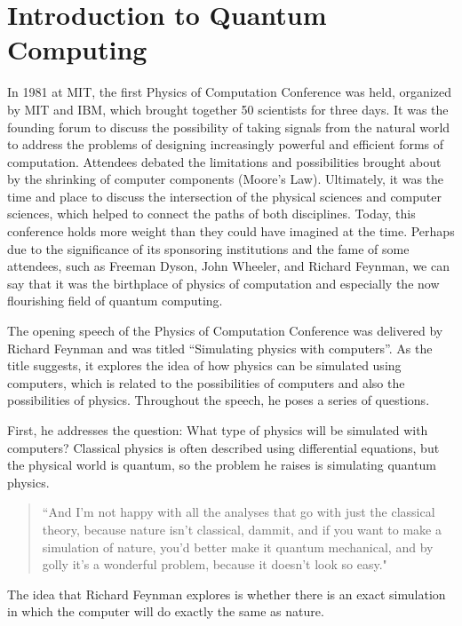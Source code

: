 
\chapter{Introduction to Quantum Computing} \label{ch:2-IntroQC}



In 1981 at MIT, the first Physics of Computation Conference was held, organized by MIT and IBM, which brought together 50 scientists for three days. It was the founding forum to discuss the possibility of taking signals from the natural world to address the problems of designing increasingly powerful and efficient forms of computation. Attendees debated the limitations and possibilities brought about by the shrinking of computer components (Moore's Law). Ultimately, it was the time and place to discuss the intersection of the physical sciences and computer sciences, which helped to connect the paths of both disciplines. Today, this conference holds more weight than they could have imagined at the time. Perhaps due to the significance of its sponsoring institutions and the fame of some attendees, such as Freeman Dyson, John Wheeler, and Richard Feynman, we can say that it was the birthplace of physics of computation and especially the now flourishing field of quantum computing.

The opening speech of the Physics of Computation Conference was delivered by Richard Feynman and was titled ``Simulating physics with computers''. As the title suggests, it explores the idea of how physics can be simulated using computers, which is related to the possibilities of computers and also the possibilities of physics. Throughout the speech, he poses a series of questions.

First, he addresses the question: What type of physics will be simulated with computers? Classical physics is often described using differential equations, but the physical world is quantum, so the problem he raises is simulating quantum physics.

\begin{quote}
    ``And I'm not happy with 
all the analyses that go with just the classical theory, because nature isn't 
classical, dammit, and if you want to make a simulation of nature, you'd 
better make it quantum mechanical, and by golly it's a wonderful problem, 
because it doesn't look so easy."
\end{quote}

The idea that Richard Feynman explores is whether there is an exact simulation in which the computer will do exactly the same as nature.

